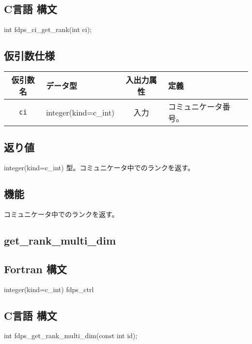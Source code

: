 \subsection*{C言語 構文}
\begin{screen}
\begin{spverbatim}
int fdps_ci_get_rank(int ci);
\end{spverbatim}
\end{screen}

\subsection*{仮引数仕様}
\begin{table}[h]
\begin{tabularx}{\linewidth}{cXcX}
\toprule
\rowcolor{Snow2}
仮引数名 & データ型 & 入出力属性 & 定義 \\
\midrule
\verb|ci| & integer(kind=c\_int) & 入力 & コミュニケータ番号。\\
\bottomrule
\end{tabularx}
\end{table}


\subsection*{返り値}
integer(kind=c\_int) 型。コミュニケータ中でのランクを返す。

\subsection*{機能}
コミュニケータ中でのランクを返す。
\clearpage

\subsection{get\_rank\_multi\_dim}
\subsection*{Fortran 構文}
\begin{screen}
\begin{spverbatim}  
integer(kind=c_int) fdps_ctrl%
\end{spverbatim}
\end{screen}

\subsection*{C言語 構文}
\begin{screen}
\begin{spverbatim}  
int fdps_get_rank_multi_dim(const int id);
\end{spverbatim}
\end{screen}

